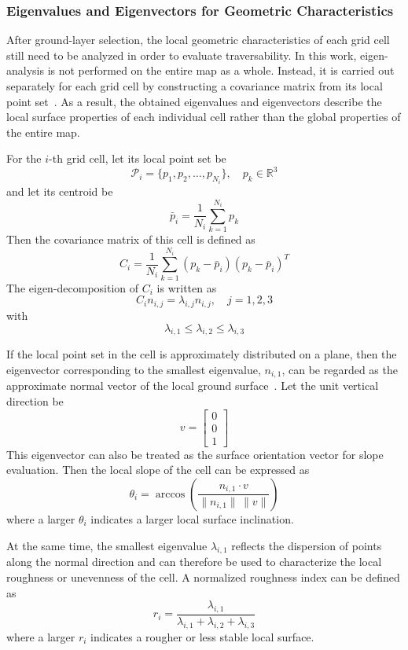 \documentclass[12pt]{interim_report}
\begin{document}
\subsubsection{Eigenvalues and Eigenvectors for Geometric Characteristics}

After ground-layer selection, the local geometric characteristics of each grid cell still need to be analyzed in order to evaluate traversability. In this work, eigen-analysis is not performed on the entire map as a whole. Instead, it is carried out separately for each grid cell by constructing a covariance matrix from its local point set~\cite{weinmann2013feature}. As a result, the obtained eigenvalues and eigenvectors describe the local surface properties of each individual cell rather than the global properties of the entire map.

For the \(i\)-th grid cell, let its local point set be
\[
\mathcal{P}_i = \{p_1, p_2, \dots, p_{N_i}\}, \quad p_k \in \mathbb{R}^3
\]
and let its centroid be
\[
\bar{p}_i = \frac{1}{N_i}\sum_{k=1}^{N_i} p_k
\]
Then the covariance matrix of this cell is defined as
\[
C_i = \frac{1}{N_i}\sum_{k=1}^{N_i}(p_k-\bar{p}_i)(p_k-\bar{p}_i)^T
\]
The eigen-decomposition of \(C_i\) is written as
\[
C_i n_{i,j}=\lambda_{i,j} n_{i,j}, \quad j=1,2,3
\]
with
\[
\lambda_{i,1}\le \lambda_{i,2}\le \lambda_{i,3}
\]

If the local point set in the cell is approximately distributed on a plane, then the eigenvector corresponding to the smallest eigenvalue, \(n_{i,1}\), can be regarded as the approximate normal vector of the local ground surface~\cite{weinmann2013feature}. Let the unit vertical direction be
\[
v=
\begin{bmatrix}
0\\
0\\
1
\end{bmatrix}
\]
This eigenvector can also be treated as the surface orientation vector for slope evaluation. Then the local slope of the cell can be expressed as
\[
\theta_i=\arccos\left(\frac{n_{i,1}\cdot v}{\|n_{i,1}\|\,\|v\|}\right)
\]
where a larger \(\theta_i\) indicates a larger local surface inclination.

At the same time, the smallest eigenvalue \(\lambda_{i,1}\) reflects the dispersion of points along the normal direction and can therefore be used to characterize the local roughness or unevenness of the cell. A normalized roughness index can be defined as
\[
r_i=\frac{\lambda_{i,1}}{\lambda_{i,1}+\lambda_{i,2}+\lambda_{i,3}}
\]
where a larger \(r_i\) indicates a rougher or less stable local surface.
\end{document}
